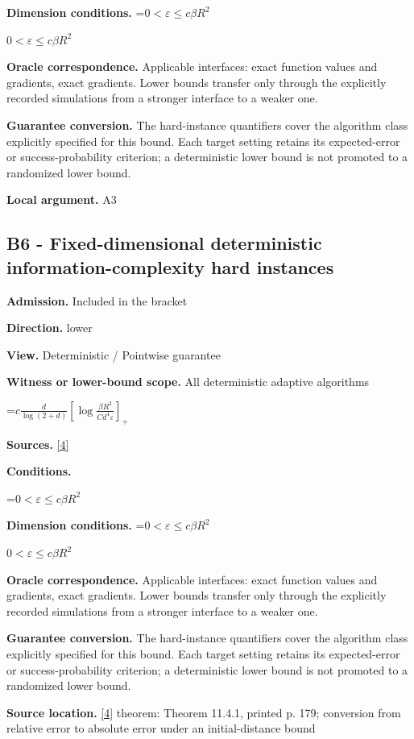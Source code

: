 \documentclass[10pt,a4paper]{article}
\newcommand{\AtlasMath}[1]{\par\begingroup\centering\setbox0=\hbox{$\displaystyle #1$}\ifdim\wd0>1.4\linewidth\typeout{ATLAS WIDE FORMULA: \the\wd0}\fi\ifdim\wd0>\linewidth\resizebox{\linewidth}{!}{\box0}\else\box0\fi\par\endgroup}
\newcommand{\AtlasInlineMath}[1]{\begingroup\setbox0=\hbox{$#1$}\ifdim\wd0>.4\linewidth\endgroup\AtlasMath{#1}\else\endgroup$#1$\fi}
\begin{document}
\textbf{Dimension conditions.} \AtlasInlineMath{0<\varepsilon\le c\beta R^2}

\textbf{Oracle correspondence.} Applicable interfaces: exact function values and gradients, exact gradients. Lower bounds transfer only through the explicitly recorded simulations from a stronger interface to a weaker one.

\textbf{Guarantee conversion.} The hard-instance quantifiers cover the algorithm class explicitly specified for this bound. Each target setting retains its expected-error or success-probability criterion; a deterministic lower bound is not promoted to a randomized lower bound.

\textbf{Local argument.} A3

\subsection{B6 - Fixed-dimensional deterministic information-complexity hard instances}
\textbf{Admission.} Included in the bracket

\textbf{Direction.} lower

\textbf{View.} Deterministic / Pointwise guarantee

\textbf{Witness or lower-bound scope.} All deterministic adaptive algorithms

\AtlasMath{c\frac d{\log(2+d)}\left[\log\frac{\beta R^2}{C d^4\varepsilon}\right]_+}
\textbf{Sources.} \href{https://www2.isye.gatech.edu/~nemirovs/LecEMCO.pdf}{[4]}

\textbf{Conditions.} 
\AtlasMath{0<\varepsilon\le c\beta R^2}


\textbf{Dimension conditions.} \AtlasInlineMath{0<\varepsilon\le c\beta R^2}

\textbf{Oracle correspondence.} Applicable interfaces: exact function values and gradients, exact gradients. Lower bounds transfer only through the explicitly recorded simulations from a stronger interface to a weaker one.

\textbf{Guarantee conversion.} The hard-instance quantifiers cover the algorithm class explicitly specified for this bound. Each target setting retains its expected-error or success-probability criterion; a deterministic lower bound is not promoted to a randomized lower bound.

\textbf{Source location.} \href{https://www2.isye.gatech.edu/~nemirovs/LecEMCO.pdf}{[4]} theorem: Theorem 11.4.1, printed p. 179; conversion from relative error to absolute error under an initial-distance bound
\end{document}
